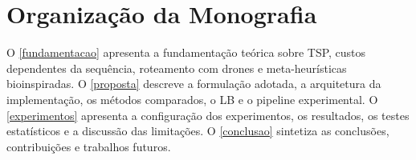 \section{Organização da Monografia}

O \autoref{fundamentacao} apresenta a fundamentação teórica sobre \ac{TSP}, custos dependentes da sequência, roteamento com drones e meta-heurísticas bioinspiradas. O \autoref{proposta} descreve a formulação adotada, a arquitetura da implementação, os métodos comparados, o \ac{LB} e o pipeline experimental. O \autoref{experimentos} apresenta a configuração dos experimentos, os resultados, os testes estatísticos e a discussão das limitações. O \autoref{conclusao} sintetiza as conclusões, contribuições e trabalhos futuros.
